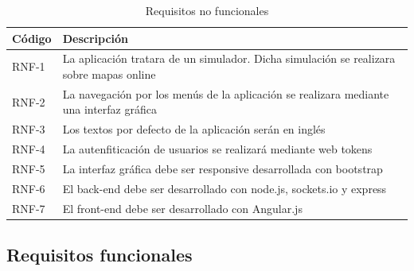 \begin{table}[H]
	\begin{center}
		\begin{tabular}{|p{1.5cm}| p{10.5cm}|}
			\hline
			Código & Descripción \\
			\hline
			RNF-1  & La aplicación tratara de un simulador. Dicha simulación se realizara sobre mapas online\\ \hline
			RNF-2  & La navegación por los menús de la aplicación se realizara mediante una interfaz gráfica\\ \hline
			RNF-3  & Los textos por defecto de la aplicación serán en inglés\\ \hline
			RNF-4  & La autenfiticación de usuarios se realizará mediante web tokens\\ \hline
			RNF-5  & La interfaz gráfica debe ser responsive desarrollada con bootstrap\\ \hline
			RNF-6  & El back-end debe ser desarrollado con node.js, sockets.io y express \\ \hline
			RNF-7  & El front-end debe ser desarrollado con Angular.js\\ \hline
		\end{tabular}
		\caption{Requisitos no funcionales}
		\label{tabla:requisitosNoFuncionales}
	\end{center}
\end{table}

\newpage

\subsection{Requisitos funcionales}


